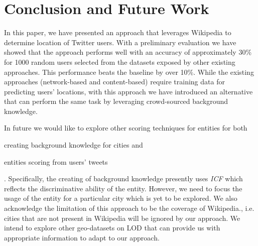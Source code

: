 \section{Conclusion and Future Work}
\label{sec:conclusion}
In this paper, we have presented an approach that leverages Wikipedia to determine location of Twitter users. With a preliminary evaluation we have showed that the approach performs well with an accuracy of approximately 30\% for 1000 random users selected from the datasets exposed by other existing approaches. This performance beats the baseline by over 10\%. While the existing approaches (network-based and content-based) require training data for predicting users' locations, with this approach we have introduced an alternative that can perform the same task by leveraging crowd-sourced background knowledge. 

In future we would like to explore other scoring techniques for entities for both \begin{inparaenum} \item creating background knowledge for cities and \item entities scoring from users' tweets \end{inparaenum}. Specifically, the creating of background knowledge presently uses \textit{ICF} which reflects the discriminative ability of the entity. However, we need to focus the usage of the entity for a particular city which is yet to be explored. We also acknowledge the limitation of this approach to be the coverage of Wikipedia., i.e. cities that are not present in Wikipedia will be ignored by our approach. We intend to explore other geo-datasets on LOD that can provide us with appropriate information to adapt to our approach.      
 

